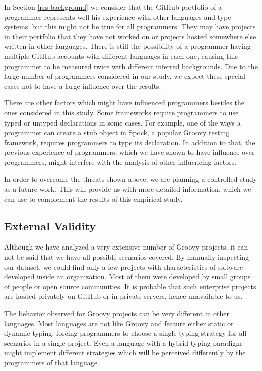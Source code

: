 \documentclass[preprint]{sigplanconf}
\begin{document}
In Section \ref{res-background} we consider that the GitHub portfolio of a programmer represents well his experience with other languages and type systems, but this might not be true for all programmers.
They may have projects in their portfolio that they have not worked on or projects hosted somewhere else written in other languages.
There is still the possibility of a programmer having multiple GitHub accounts with different languages in each one, causing this programmer to be measured twice with different inferred backgrounds.
Due to the large number of programmers considered in our study, we expect these special cases not to have a large influence over the results.

There are other factors which might have influenced programmers besides the ones considered in this study.
Some frameworks require programmers to use typed or untyped declarations in some cases.
For example, one of the ways a programmer can create a stub object in Spock, a popular Groovy testing framework, requires programmers to type its declaration.
In addition to that, the previous experience of programmers, which we have shown to have influence over programmers, might interfere with the analysis of other influencing factors.

In order to overcome the threats shown above, we are planning a controlled study as a future work.
This will provide us with more detailed information, which we can use to complement the results of this empirical study.

\subsection*{External Validity}
Although we have analyzed a very extensive number of Groovy projects, it can not be said that we have all possible scenarios covered.
By manually inspecting our dataset, we could find only a few projects with characteristics of software developed inside an organization.
Most of them were developed by small groups of people or open source communities.
It is probable that such enterprise projects are hosted privately on GitHub or in private servers, hence unavailable to us.

The behavior observed for Groovy projects can be very different in other languages.
Most languages are not like Groovy and feature either static or dynamic typing, forcing programmers to choose a single typing strategy for all scenarios in a single project.
Even a language with a hybrid typing paradigm might implement different strategies which will be perceived differently by the programmers of that language.
\end{document}
